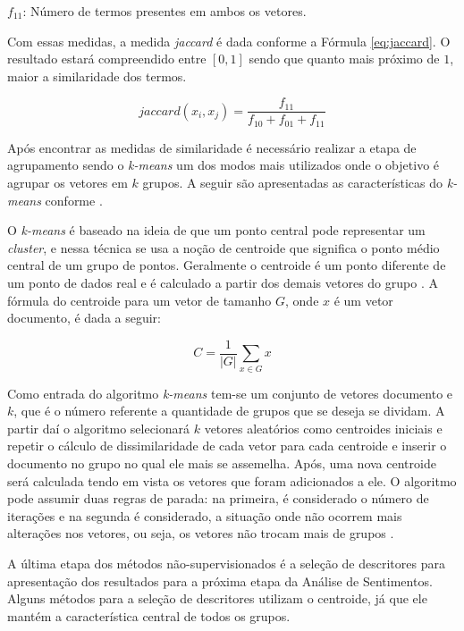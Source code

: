 $f_{11}$: Número de termos presentes em ambos os vetores.

Com essas medidas, a medida \textit{jaccard} é dada conforme a Fórmula \ref{eq:jaccard}. O resultado estará compreendido entre $\left [ 0,1 \right ]$ sendo que quanto mais próximo de $1$, maior a similaridade dos termos.

\begin{equation}
    \label{eq:jaccard}
     jaccard(x_{i},x_{j}) = \frac{f_{11} }{f_{10} +f_{01}  + f_{11} }
\end{equation}

Após encontrar as medidas de similaridade é necessário  realizar a etapa de agrupamento sendo o \textit{k-means} um dos modos mais utilizados onde o objetivo é agrupar os vetores em $k$ grupos. A seguir são apresentadas as características do \textit{k-means} conforme  .

O \textit{k-means} é baseado na ideia de que um ponto central pode representar um \textit{cluster}, e nessa técnica se usa a noção de centroide que significa o ponto médio central de um grupo de pontos. Geralmente o centroide é um ponto diferente de um ponto de dados real e é calculado a partir dos demais vetores do grupo \cite{Steinbach00acomparison}. A fórmula do centroide para um vetor de tamanho $G$, onde $x$ é um vetor documento, é dada a seguir:

\begin{equation}
    \label{eq:centroide}
     C=\frac{1}{|G|}\sum_{x \in G}x
\end{equation}

Como entrada do algoritmo \textit{k-means} tem-se um conjunto de vetores documento e $k$, que é o número referente a quantidade de grupos que se deseja se dividam. A partir daí o algoritmo selecionará $k$ vetores aleatórios como centroides iniciais e repetir o cálculo de dissimilaridade de cada vetor para cada centroide e inserir o documento no grupo no qual ele mais se assemelha. Após, uma nova centroide será calculada tendo em vista os vetores que foram adicionados a ele. O algoritmo pode assumir duas regras de parada: na primeira, é considerado o número de iterações e na segunda é considerado, a situação onde não ocorrem mais alterações nos vetores, ou seja, os vetores não trocam mais de grupos \cite{Steinbach00acomparison}.

A última etapa dos métodos não-supervisionados é a seleção de descritores para apresentação dos resultados para a próxima etapa da Análise de Sentimentos. Alguns métodos para a seleção de descritores utilizam o centroide, já que ele mantém a característica central de todos os grupos.

